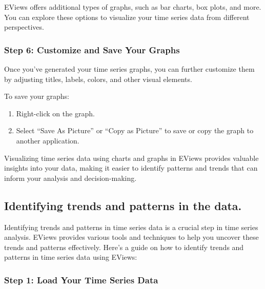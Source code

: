 \documentclass[
  letterpaper,
  DIV=11,
  numbers=noendperiod]{scrartcl}
\begin{document}
EViews offers additional types of graphs, such as bar charts, box plots,
and more. You can explore these options to visualize your time series
data from different perspectives.

\hypertarget{step-6-customize-and-save-your-graphs}{%
\subsubsection{\texorpdfstring{\textbf{Step 6: Customize and Save Your
Graphs}}{Step 6: Customize and Save Your Graphs}}\label{step-6-customize-and-save-your-graphs}}

Once you've generated your time series graphs, you can further customize
them by adjusting titles, labels, colors, and other visual elements.

To save your graphs:

\begin{enumerate}
\def\labelenumi{\arabic{enumi}.}
\item
  Right-click on the graph.
\item
  Select ``Save As Picture'' or ``Copy as Picture'' to save or copy the
  graph to another application.
\end{enumerate}

Visualizing time series data using charts and graphs in EViews provides
valuable insights into your data, making it easier to identify patterns
and trends that can inform your analysis and decision-making.

\hypertarget{identifying-trends-and-patterns-in-the-data.}{%
\subsection{Identifying trends and patterns in the
data.}\label{identifying-trends-and-patterns-in-the-data.}}

Identifying trends and patterns in time series data is a crucial step in
time series analysis. EViews provides various tools and techniques to
help you uncover these trends and patterns effectively. Here's a guide
on how to identify trends and patterns in time series data using EViews:

\hypertarget{step-1-load-your-time-series-data-1}{%
\subsubsection{\texorpdfstring{\textbf{Step 1: Load Your Time Series
Data}}{Step 1: Load Your Time Series Data}}\label{step-1-load-your-time-series-data-1}}
\end{document}
